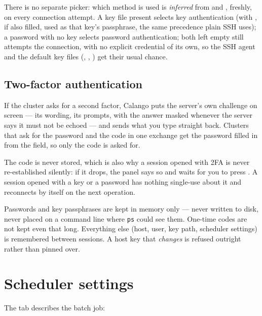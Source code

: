 \begin{calnote}
There is no separate  picker: which method is used is
\emph{inferred} from  and , freshly, on every
connection attempt. A key file present selects key authentication (with
, if also filled, used as that key's passphrase, the same
precedence plain SSH uses); a password with no key selects password
authentication; both left empty still attempts the connection, with no
explicit credential of its own, so the SSH agent and the default key files
(, ,
) get their usual chance.
\end{calnote}

\subsection*{Two-factor authentication}

If the cluster asks for a second factor, Calango puts the server's own
challenge on screen --- its wording, its prompts, with the answer masked
whenever the server says it must not be echoed --- and sends what you type
straight back. Clusters that ask for the password and the code in one
exchange get the password filled in from the  field, so only
the code is asked for.

The code is never stored, which is also why a session opened with 2FA is
never re-established silently: if it drops, the panel says so and waits for
you to press . A session opened with a key or a password has
nothing single-use about it and reconnects by itself on the next operation.

\begin{calwarn}
Passwords and key passphrases are kept in memory only --- never written to
disk, never placed on a command line where \texttt{ps} could see them.
One-time codes are not kept even that long. Everything else (host, user,
key path, scheduler settings) is remembered between sessions. A host key
that \emph{changes} is refused outright rather than pinned over.
\end{calwarn}

\section{Scheduler settings}

The  tab describes the batch job:

